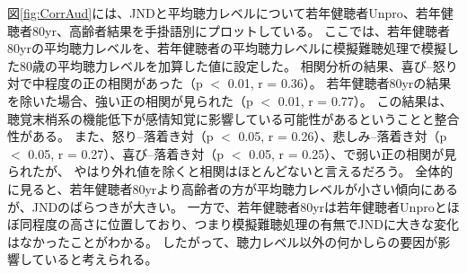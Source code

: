 図\ref{fig:CorrAud}には、JNDと平均聴力レベルについて若年健聴者Unpro、若年健聴者80yr、高齢者結果を手掛語別にプロットしている。
ここでは、若年健聴者80yrの平均聴力レベルを、若年健聴者の平均聴力レベルに模擬難聴処理で模擬した80歳の平均聴力レベル\cite{tsuiki2002nihon}を加算した値に設定した。
相関分析の結果、喜び--怒り対で中程度の正の相関があった（p $<$ 0.01, r = 0.36）。
若年健聴者80yrの結果を除いた場合、強い正の相関が見られた（p $<$ 0.01, r = 0.77）。
この結果は、聴覚末梢系の機能低下が感情知覚に影響している可能性があるということと整合性がある。
また、怒り--落着き対（p $<$ 0.05, r = 0.26）、悲しみ--落着き対（p $<$ 0.05, r = 0.27）、喜び--落着き対（p $<$ 0.05, r = 0.25）、で弱い正の相関が見られたが、
やはり外れ値を除くと相関はほとんどないと言えるだろう。
全体的に見ると、若年健聴者80yrより高齢者の方が平均聴力レベルが小さい傾向にあるが、JNDのばらつきが大きい。
一方で、若年健聴者80yrは若年健聴者Unproとほぼ同程度の高さに位置しており、つまり模擬難聴処理の有無でJNDに大きな変化はなかったことがわかる。
したがって、聴力レベル以外の何かしらの要因が影響していると考えられる。




